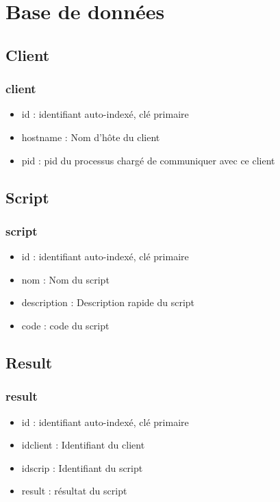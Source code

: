 \section{Base de données}

\subsection{Client}
		\begin{frame}
		    \frametitle{\textbf{client}}
			\begin{itemize}
				\item id : identifiant auto-indexé, clé primaire
				\item hostname : Nom d'hôte du client
				\item pid : pid du processus chargé de communiquer avec ce client
			\end{itemize}
		\end{frame}

\subsection{Script}
	\begin{frame}
		\frametitle{\textbf{script}}
		\begin{itemize}
				\item id : identifiant auto-indexé, clé primaire
				\item nom : Nom du script
				\item description : Description rapide du script
				\item code : code du script
		\end{itemize}
	\end{frame}

\subsection{Result}
	\begin{frame}
		\frametitle{\textbf{result}}
		\begin{itemize}
				\item id : identifiant auto-indexé, clé primaire
				\item idclient : Identifiant du client
				\item idscrip : Identifiant du script
				\item result : résultat du script
		\end{itemize}
	\end{frame}

